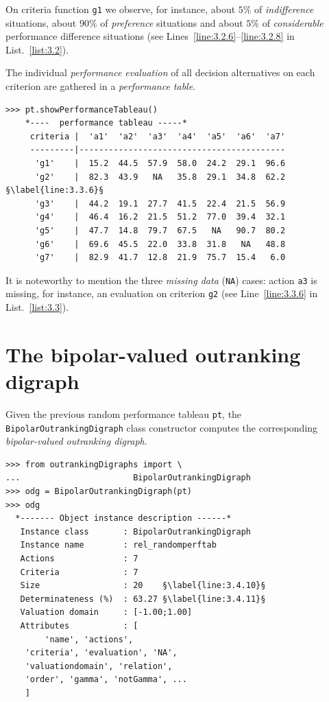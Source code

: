On criteria function \texttt{g1} we observe, for instance, about $5\%$ of \emph{indifference} situations, about $90\%$ of \emph{preference} situations and about $5\%$ of \emph{considerable} performance difference situations (see Lines~\ref{line:3.2.6}--\ref{line:3.2.8} in List.~\vref{list:3.2}).

The individual \emph{performance evaluation} of all decision alternatives on each criterion are gathered in a \emph{performance table}.
\begin{lstlisting}[caption={Inspecting the performance evaluations},label=list:3.3]
>>> pt.showPerformanceTableau()
    *----  performance tableau -----*
     criteria |  'a1'  'a2'  'a3'  'a4'  'a5'  'a6'  'a7'   
     ---------|------------------------------------------
      'g1'    |  15.2  44.5  57.9  58.0  24.2  29.1  96.6  
      'g2'    |  82.3  43.9   NA   35.8  29.1  34.8  62.2  §\label{line:3.3.6}§
      'g3'    |  44.2  19.1  27.7  41.5  22.4  21.5  56.9  
      'g4'    |  46.4  16.2  21.5  51.2  77.0  39.4  32.1  
      'g5'    |  47.7  14.8  79.7  67.5   NA   90.7  80.2  
      'g6'    |  69.6  45.5  22.0  33.8  31.8   NA   48.8  
      'g7'    |  82.9  41.7  12.8  21.9  75.7  15.4   6.0  
\end{lstlisting}

It is noteworthy to mention the three \emph{missing data} (\texttt{NA}) cases: action \texttt{a3} is missing, for instance, an evaluation on criterion \texttt{g2} (see Line~\ref{line:3.3.6} in List.~\vref{list:3.3}).
    
\section{The bipolar-valued outranking digraph}
\label{sec:3.2}

Given the previous random performance tableau \texttt{pt}, the \texttt{BipolarOutranking\-Digraph} class constructor computes the corresponding \emph{bipolar-valued outranking digraph}. 
\begin{lstlisting}[caption={Example of random bipolar-valued outranking digraph.},label=list:3.4]
>>> from outrankingDigraphs import \
...                       BipolarOutrankingDigraph
>>> odg = BipolarOutrankingDigraph(pt)
>>> odg
  *------- Object instance description ------*
   Instance class       : BipolarOutrankingDigraph
   Instance name        : rel_randomperftab
   Actions              : 7
   Criteria             : 7
   Size                 : 20    §\label{line:3.4.10}§
   Determinateness (%)  : 63.27 §\label{line:3.4.11}§
   Valuation domain     : [-1.00;1.00]
   Attributes           : [
        'name', 'actions', 
	'criteria', 'evaluation', 'NA',
	'valuationdomain', 'relation', 
	'order', 'gamma', 'notGamma', ...
	]
\end{lstlisting}

